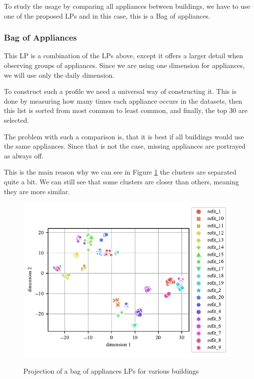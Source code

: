 To study the usage by comparing all appliances between buildings,
we have to use one of the proposed LPs and in this case, this is a Bag of appliances.

\subsubsection{Bag of Appliances}

This LP is a combination of the LPs above,
except it offers a larger detail when observing groups of appliances.
Since we are using one dimension for appliances, we will use only the daily dimension.

To construct such a profile we need a universal way of constructing it.
This is done by measuring how many times each appliance occurs in the datasets,
then this list is sorted from most common to least common, and finally, the top 30 are selected.

The problem with such a comparison is, that it is best 
if all buildings would use the same appliances.
Since that is not the case, missing appliances are portrayed as always off. 

This is the main reason why we can see in Figure \ref{fig:tsne_boa_scatter_refit8} the clusters are separated quite a bit.
We can still see that some clusters are closer than others,
meaning they are more similar.  

\begin{figure}[H]
	\centering
	\caption{Projection of a bag of appliances LPs for various buildings}
	\includegraphics[]{Figures/TSNE/TSNE_BOA/scatter_refit_boa.pdf}
	\label{fig:tsne_boa_scatter_refit8}
\end{figure} 


